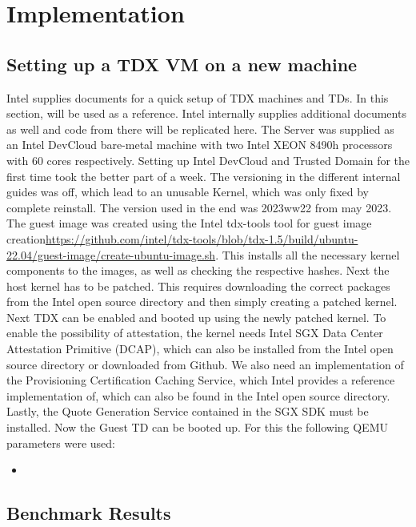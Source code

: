 
\chapter{Implementation}

\section{Setting up a TDX VM on a new machine}
\label{ch:SettingUpTDX}
Intel supplies documents for a quick setup of TDX machines and TDs. In this section, \cite{noauthor_white_nodate} will be used as a reference. Intel internally supplies additional documents as well and code from there will be replicated here. The Server was supplied as an Intel DevCloud bare-metal machine with two Intel XEON 8490h processors with 60 cores respectively. Setting up Intel DevCloud and Trusted Domain for the first time took the better part of a week. The versioning in the different internal guides was off, which lead to an unusable Kernel, which was only fixed by complete reinstall. The version used in the end was 2023ww22 from may 2023. The guest image was created using the Intel tdx-tools tool for guest image creation\url{https://github.com/intel/tdx-tools/blob/tdx-1.5/build/ubuntu-22.04/guest-image/create-ubuntu-image.sh}.
This installs all the necessary kernel components to the images, as well as checking the respective hashes. Next the host kernel has to be patched. This requires downloading the correct packages from the Intel open source directory and then simply creating a patched kernel. Next TDX can be enabled and booted up using the newly patched kernel. To enable the possibility of attestation, the kernel needs Intel SGX Data Center Attestation Primitive (DCAP), which can also be installed from the Intel open source directory or downloaded from Github. We also need an implementation of the Provisioning Certification Caching Service, which Intel provides a reference implementation of, which can also be found in the Intel open source directory. Lastly, the Quote Generation Service contained in the SGX SDK must be installed. Now the Guest TD can be booted up. For this the following QEMU parameters were used:

\begin{itemize}
    \item {}
\end{itemize}

\section{Benchmark Results}

